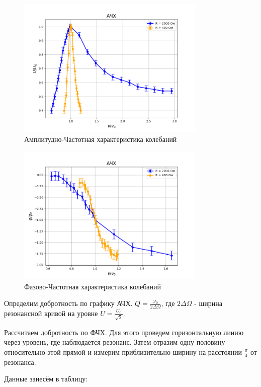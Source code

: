 \documentclass[a4paper]{article}
\begin{document}
\begin{figure}[h!]
\centering
\includegraphics[width=0.8\textwidth]{Figure_2.png}
\caption{Амплитудно-Частотная характеристика колебаний}
\end{figure}

\begin{figure}[h!]
\centering
\includegraphics[width=0.8\textwidth]{Figure_3.png}
\caption{Фазово-Частотная характеристика колебаний}
\end{figure}

\noindent Определим добротность по графику АЧХ. 
$Q = \frac{\omega_0}{2\Delta \Omega}$, где $2\Delta \Omega$ - ширина резонансной кривой на уровне $U = \frac{U_0}{\sqrt{2}}$.
	
\noindent Рассчитаем добротность по ФЧХ. 
Для этого проведем горизонтальную линию через уровень, где наблюдается резонанс.
Затем отразим одну половину относительно этой прямой и измерим приблизительно ширину на расстоянии $\frac{\pi}{4}$ от резонанса.

\noindent Данные занесём в таблицу:
\end{document}
